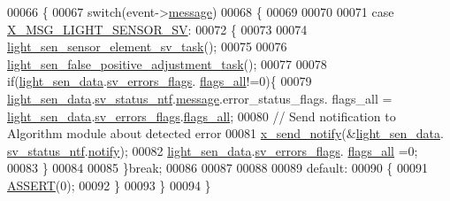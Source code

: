 \begin{DoxyCode}
00066 \{
00067     \textcolor{keywordflow}{switch}(event->\hyperlink{a00036_adf9665938515a20c283eea2c978cf80d}{message})
00068     \{
00069 
00070     
00071         \textcolor{keywordflow}{case} \hyperlink{a00024_a5877f449ae4b7e77914fedf212c3d01f}{X\_MSG\_LIGHT\_SENSOR\_SV}:
00072         \{
00073 
00074             \hyperlink{a00047_ae68a20cad10654012eae75a1941f53db}{light\_sen\_sensor\_element\_sv\_task}();
00075 
00076             \hyperlink{a00047_a05bd338db50fc948cf13db4f250894da}{light\_sen\_false\_positive\_adjustment\_task}();
00077 
00078             \textcolor{keywordflow}{if}(\hyperlink{a00047_a53c98c9f84d5cecf0747bbe1f6b83696}{light\_sen\_data}.\hyperlink{a00024_aaeec6b0609dba31393f337abf1cce3d3}{sv\_errors\_flags}.
      \hyperlink{a00022_a1caa87b00c878186140c3bac9c8acf3b}{flags\_all}!=0)\{
00079              \hyperlink{a00047_a53c98c9f84d5cecf0747bbe1f6b83696}{light\_sen\_data}.\hyperlink{a00024_a35ce77844e6990e2537b2f11cd2d5cca}{sv\_status\_ntf}.\hyperlink{a00018_a18ed963ee616596e9d500e042f228818}{message}.error\_status\_flags.
      flags\_all = \hyperlink{a00047_a53c98c9f84d5cecf0747bbe1f6b83696}{light\_sen\_data}.\hyperlink{a00024_aaeec6b0609dba31393f337abf1cce3d3}{sv\_errors\_flags}.\hyperlink{a00022_a1caa87b00c878186140c3bac9c8acf3b}{flags\_all};
00080              \textcolor{comment}{// Send notification to Algorithm module about detected error}
00081              \hyperlink{a00036_ae17b0bb16da3c471bb6074bb4c4d0fee}{x\_send\_notify}(&\hyperlink{a00047_a53c98c9f84d5cecf0747bbe1f6b83696}{light\_sen\_data}.
      \hyperlink{a00024_a35ce77844e6990e2537b2f11cd2d5cca}{sv\_status\_ntf}.\hyperlink{a00018_a8e6a04c2283f9fd7b8dcbc62faba5847}{notify});
00082              \hyperlink{a00047_a53c98c9f84d5cecf0747bbe1f6b83696}{light\_sen\_data}.\hyperlink{a00024_aaeec6b0609dba31393f337abf1cce3d3}{sv\_errors\_flags}.
      \hyperlink{a00022_a1caa87b00c878186140c3bac9c8acf3b}{flags\_all} =0;
00083             \}
00084             
00085         \}\textcolor{keywordflow}{break};
00086       
00087 
00088         
00089         \textcolor{keywordflow}{default}:
00090         \{
00091             \hyperlink{a00072_abb8ff8e213ac9f6fb21d2b968583b936}{ASSERT}(0);
00092         \}        
00093     \}
00094 \}
\end{DoxyCode}


